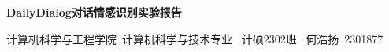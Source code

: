 \begin{center}
	{\textbf{DailyDialog对话情感识别实验报告}}
	
	{ 计算机科学与工程学院\ 计算机科学与技术专业 \ 计硕2302班 \ 何浩扬\ 2301877}
\end{center}

\vspace{1ex}


